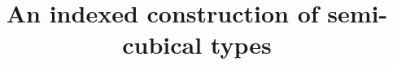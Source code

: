 \documentclass[a4paper,english,cleveref,autoref,thm-restate]{article}
\newcommand{\sort}[1]{\mathsf{U}_{#1}}
\newcommand{\deprewlr}[1]{\raisebox{0em}{$\ulcorner$}\!#1}
\newcommand{\deprewrl}[1]{{#1}\raisebox{-0.2em}{$\!\lrcorner$}}
\begin{document}
\title{An indexed construction of semi-cubical types}

\maketitle

\newcommand{\emptysigma}{\bullet}
\newcommand{\itsemterm}[4]{\llbracket #4 \rrbracket^{#2;#3}_{#1}}
\newcommand{\itsemtype}[4]{\llbracket #4 \rrbracket^{#2;#3}_{#1}}
\newcommand{\semterm}[3]{\llbracket #3 \rrbracket^{#1;#2}}
\newcommand{\semtype}[3]{\llbracket #3 \rrbracket^{#1;#2}}
\newcommand{\incrstep}[3]{\mathsf{split}_{#1}{#3}(#2)}
\newcommand{\distrstep}[3]{\mathsf{distr}_{#1}{#3}(#2)}
\newcommand{\applytype}[4]{\mathsf{apptype}_{#1}^{#2}(#3,#4)}
\newcommand{\shrink}[3]{\mathsf{shrink}_{#1}\,{#2}\,#3}
\newcommand{\under}[3]{\mathsf{under}_{#1}\,{#2}\,#3}
\newcommand{\undertau}[3]{\mathsf{under}_{#1}^{#2}\,#3}
\newcommand{\proj}[3]{\pi_{#1}^{#2}\,#3}
\newcommand{\elt}[2]{\mathsf{El}_{#1}\,#2}
\newcommand{\semtypenew}[2]{| #2 |_{#1}}
\newcommand{\semnew}[2]{\llbracket #2 \rrbracket_{#1}}
\newcommand{\semctx}[2]{\llbracket #2 \rrbracket_{#1}}
\newcommand{\semlam}[5]{\mathsf{lam}_{#1}^{#2}\,#4\,(#3)\,#5}
\newcommand{\semlambis}[5]{\mathsf{lam'}_{#1}^{#2}\,#4\,(#3)\,#5}
\newcommand{\semapp}[3]{\mathsf{app}_{#1}#2\,#3}
\newcommand{\semprod}[5]{\mathsf{prod}_{#1}^{#2}\,#4\,(#3)\,#5}
\newcommand{\access}[2]{\mathsf{get}_{#1}(#2)}
\newcommand{\accesstyped}[3]{\mathsf{get}_{#1}^{#2}(#3)}
\newcommand{\lift}[1]{\mathsf{lift}\, {#1}}
\newcommand{\liftlr}[1]{\mathsf{lift}^\rightarrow\, {#1}}
\newcommand{\liftrl}[1]{\mathsf{lift}^\leftarrow\, {#1}}
\newcommand{\diag}[2]{\mathsf{diag}_{#1}(#2)}
\newcommand{\semsort}[1]{\mathsf{sort}_{#1}}
\newcommand{\reflsort}[1]{\mathsf{refl}^{\sort{}}_{#1}}
\newcommand{\mktuplenew}[6]{\{#4\,|\begin{array}{l} #5 \\ #6 \end{array}\}_{#1,#2,#3}}
\newcommand{\mktuplein}[4]{{#1}; {#2}; {#3}; {#4}}
\newcommand{\nwconn}[2]{\deprewlr{#2}_{#1}}
\newcommand{\seconn}[2]{\deprewrl{#2}_{#1}}
\newcommand{\refltermn}[3]{\mathsf{reflterm}_{#1}(#3)}
\newcommand{\refltypen}[2]{\mathsf{refltype}_{#1}(#2)}

\newcommand{\restrict}{\mathsf{restrict}}
\newcommand{\MofL}{\mathsf{underlying}}
\newcommand{\defequiv}{\mathsf{\simeq}}
\newcommand{\isequivalence}{\mathsf{isequiv}}
\newcommand{\gpdlevel}{\mathsf{gpdlevel}}
\newcommand{\regrefl}{\mathsf{regrefl}}
\end{document}
